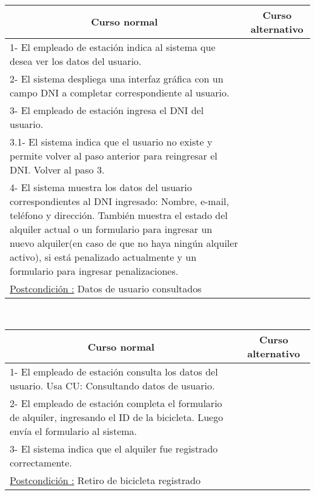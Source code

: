 ~

\begin{center}
    \centering
    \begin{tabular}{ | p{11cm} | p{6cm} | }
    	\multicolumn{1}{c}{\cellcolor{black!30}\textbf{Curso normal}} & 
    	\multicolumn{1}{c}{\cellcolor{black!30}\textbf{Curso alternativo}} \\
		\hline
		1- El empleado de estación indica al sistema que desea ver los datos del usuario. &  \\ \hline
		2- El sistema despliega una interfaz gráfica con un campo DNI a completar correspondiente al usuario. &  \\ \hline
		3- El empleado de estación ingresa el DNI del usuario. & \\ \hline  
		3.1- El sistema indica que el usuario no existe y permite volver al paso anterior para reingresar el DNI. Volver al paso 3. \\ \hline
		4- El sistema muestra los datos del usuario correspondientes al DNI ingresado: Nombre, e-mail, teléfono y dirección. También muestra el estado del alquiler actual o un formulario para ingresar un nuevo alquiler(en caso de que no haya ningún alquiler activo), si está penalizado actualmente y un formulario para ingresar penalizaciones. & \\ \hline		
		\underline{Postcondición :} Datos de usuario consultados & \\ \hline
    \end{tabular}
\end{center}

~

\begin{center}
    \centering
    \begin{tabular}{ | p{11cm} | p{6cm} | }
    	\multicolumn{1}{c}{\cellcolor{black!30}\textbf{Curso normal}} & 
    	\multicolumn{1}{c}{\cellcolor{black!30}\textbf{Curso alternativo}} \\
		\hline
		1- El empleado de estación consulta los datos del usuario. Usa CU: Consultando datos de usuario. &  \\ \hline
		2- El empleado de estación completa el formulario de alquiler, ingresando el ID de la bicicleta. Luego envía el formulario al sistema. & \\ \hline
		3- El sistema indica que el alquiler fue registrado correctamente. & \\ \hline
		\underline{Postcondición :} Retiro de bicicleta registrado & \\ \hline
    \end{tabular}
\end{center}

